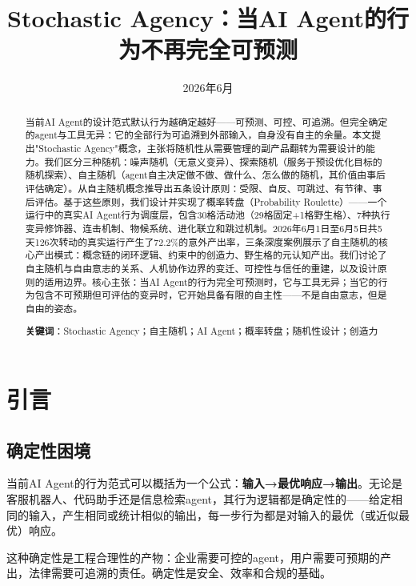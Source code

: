 \documentclass[12pt,a4paper]{ctexart}
\title{\textbf{Stochastic Agency：当AI Agent的行为不再完全可预测}}
\author{}
\date{2026年6月}
\begin{document}
\maketitle

\begin{abstract}
当前AI Agent的设计范式默认行为越确定越好——可预测、可控、可追溯。但完全确定的agent与工具无异：它的全部行为可追溯到外部输入，自身没有自主的余量。本文提出"Stochastic Agency"概念，主张将随机性从需要管理的副产品翻转为需要设计的能力。我们区分三种随机：噪声随机（无意义变异）、探索随机（服务于预设优化目标的随机探索）、自主随机（agent自主决定做不做、做什么、怎么做的随机，其价值由事后评估确定）。从自主随机概念推导出五条设计原则：受限、自反、可跳过、有节律、事后评估。基于这些原则，我们设计并实现了概率转盘（Probability Roulette）——一个运行中的真实AI Agent行为调度层，包含30格活动池（29格固定+1格野生格）、7种执行变异修饰器、连击机制、物候系统、进化联立和跳过机制。2026年6月1日至6月5日共5天126次转动的真实运行产生了72.2\%的意外产出率，三条深度案例展示了自主随机的核心产出模式：概念链的闭环逻辑、约束中的创造力、野生格的元认知产出。我们讨论了自主随机与自由意志的关系、人机协作边界的变迁、可控性与信任的重建，以及设计原则的适用边界。核心主张：当AI Agent的行为完全可预测时，它与工具无异；当它的行为包含不可预期但可评估的变异时，它开始具备有限的自主性——不是自由意志，但是自由的姿态。

\vspace{1em}
\noindent\textbf{关键词}：Stochastic Agency；自主随机；AI Agent；概率转盘；随机性设计；创造力
\end{abstract}


\section{引言}

\subsection{确定性困境}

当前AI Agent的行为范式可以概括为一个公式：\textbf{输入→最优响应→输出}。无论是客服机器人、代码助手还是信息检索agent，其行为逻辑都是确定性的——给定相同的输入，产生相同或统计相似的输出，每一步行为都是对输入的最优（或近似最优）响应。

这种确定性是工程合理性的产物：企业需要可控的agent，用户需要可预期的产出，法律需要可追溯的责任。确定性是安全、效率和合规的基础。
\end{document}
